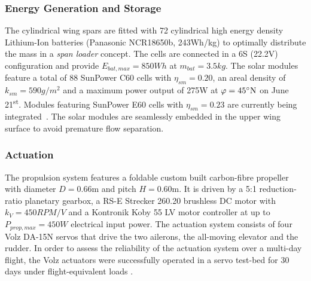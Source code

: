 \subsubsection{Energy Generation and Storage}
The cylindrical wing spars are fitted with 72 cylindrical high energy density Lithium-Ion batteries (Panasonic NCR18650b, 243Wh/kg) to optimally distribute the mass in a \textit{span loader} concept. The cells are connected in a 6S (22.2V) configuration and provide $E_{bat,max}=850Wh$ at $m_{bat}=3.5kg$. The solar modules feature a total of 88 SunPower C60 cells with $\eta_{sm}=0.20$, an areal density of $k_{sm}=590g/m^2$ and a maximum power output of 275W at $\varphi=45\degree \textrm{N}$ on June 21\textsuperscript{st}. Modules featuring SunPower E60 cells with $\eta_{sm}=0.23$ are currently being integrated~\cite{Sunier_EPFLSolarModules}. The solar modules are seamlessly embedded in the upper wing surface to avoid premature flow separation.

\subsubsection{Actuation}
The propulsion system features a foldable custom built carbon-fibre propeller with diameter $D=0.66\textrm{m}$ and pitch $H=0.60\textrm{m}$. It is driven by a 5:1 reduction-ratio planetary gearbox, a RS-E Strecker 260.20 brushless DC motor with $k_V=450RPM/V$ and a Kontronik Koby 55 LV motor controller at up to $P_{prop,max}=450W$ electrical input power. The actuation system consists of four Volz DA-15N servos that drive the two ailerons, the all-moving elevator and the rudder. In order to assess the reliability of the actuation system over a multi-day flight, the Volz actuators were successfully operated in a servo test-bed for 30 days under flight-equivalent loads \cite{DellaCa_BT}.


